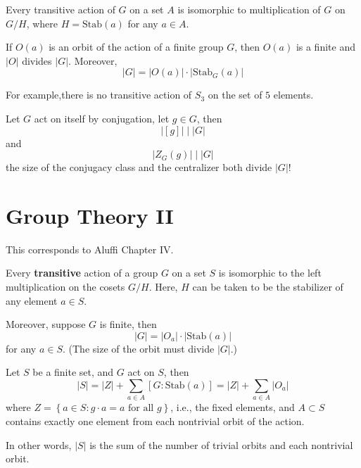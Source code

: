 \documentclass[openany]{book}
\begin{document}
\begin{prop}
    Every transitive action of $G$ on a set $A$ is isomorphic to multiplication of $G$ on $G/H$, where $H=\text{Stab}(a)$ for any $a\in A$.
\end{prop}


\begin{prop}
    If $O(a)$ is an orbit of the action of a finite group $G$, then $O(a)$ is a finite and $|O|$ divides $|G|$. Moreover, 
    \begin{equation*}
        |G|=|O(a)|\cdot|\text{Stab}_G(a)|
    \end{equation*}

    For example,there is no transitive action of $S_3$ on the set of $5$ elements. 
\end{prop}

\begin{prop}
    Let $G$ act on itself by conjugation, let $g\in G$, then 
    \begin{equation*}
        |[g]|\mid |G|
    \end{equation*}
    and 
    \begin{equation*}
        |Z_G(g)|\mid |G|
    \end{equation*}
    the size of the conjugacy class and the centralizer both divide $|G|$!
\end{prop}








\chapter{Group Theory II}
This corresponds to Aluffi Chapter IV.


\begin{prop}
    Every \textbf{transitive} action of a group $G$ on a set $S$ is isomorphic to the left multiplication on the cosets $G/H$. Here, $H$ can be taken to be the stabilizer of any element $a\in S$. 

    Moreover, suppose $G$ is finite, then 
    \begin{equation*}
        |G|=|O_a|\cdot|\text{Stab}(a)|
    \end{equation*}
    for any $a\in S$. (The size of the orbit must divide $|G|$.)
\end{prop}



\begin{prop}
    Let $S$ be a finite set, and $G$ act on $S$, then 
    \begin{equation*}
        |S|=|Z|+\sum_{a\in A}[G: \text{Stab}(a)]=|Z|+\sum_{a\in A}|O_a|
    \end{equation*} 
    where $Z=\left\{a\in S: g\cdot a=a\text{ for all } g\right\}$, i.e., the fixed elements, and $A\subset S$ contains exactly one element from each nontrivial orbit of the action. 
    
    In other words, $|S|$ is the sum of the number of trivial orbits and each nontrivial orbit.
\end{prop}
\end{document}

